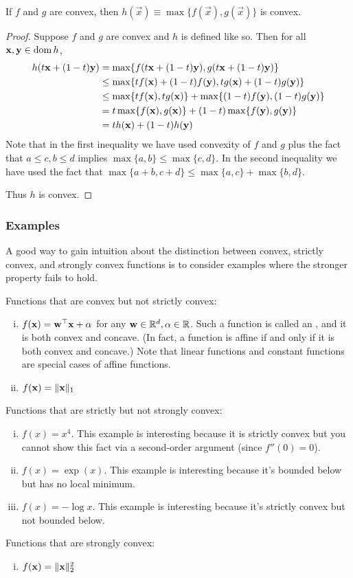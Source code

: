 \begin{proposition}
If $f$ and $g$ are convex, then $h(\vec{x}) \equiv \max\{f(\vec{x}), g(\vec{x})\}$ is convex.
\end{proposition}
\begin{proof}
Suppose $f$ and $g$ are convex and $h$ is defined like so. Then for all $\mathbf{x}, \mathbf{y} \in \operatorname*{dom} h$,
\begin{align*}
h(t\mathbf{x} + (1-t)\mathbf{y}) &= \max\{f(t\mathbf{x} + (1-t)\mathbf{y}), g(t\mathbf{x} + (1-t)\mathbf{y})\} \\
&\leq \max\{tf(\mathbf{x}) + (1-t)f(\mathbf{y}), tg(\mathbf{x}) + (1-t)g(\mathbf{y})\} \\
&\leq \max\{tf(\mathbf{x}), tg(\mathbf{x})\} + \max\{(1-t)f(\mathbf{y}), (1-t)g(\mathbf{y})\} \\
&= t\max\{f(\mathbf{x}), g(\mathbf{x})\} + (1-t)\max\{f(\mathbf{y}), g(\mathbf{y})\} \\
&= th(\mathbf{x}) + (1-t)h(\mathbf{y})
\end{align*}
Note that in the first inequality we have used convexity of $f$ and $g$ plus the fact that $a \leq c, b \leq d$ implies $\max\{a,b\} \leq \max\{c,d\}$.
In the second inequality we have used the fact that $\max\{a+b, c+d\} \leq \max\{a,c\} + \max\{b,d\}$.

Thus $h$ is convex.
\end{proof}

\subsubsection{Examples}
A good way to gain intuition about the distinction between convex, strictly convex, and strongly convex functions is to consider examples where the stronger property fails to hold.

Functions that are convex but not strictly convex:
\begin{enumerate}[(i)]
\item $f(\mathbf{x}) = \mathbf{w}^\top\mathbf{x} + \alpha$ for any $\mathbf{w} \in \mathbb{R}^d, \alpha \in \mathbb{R}$.
Such a function is called an , and it is both convex and concave.
(In fact, a function is affine if and only if it is both convex and concave.)
Note that linear functions and constant functions are special cases of affine functions.
\item $f(\mathbf{x}) = \|\mathbf{x}\|_1$
\end{enumerate}

Functions that are strictly but not strongly convex:
\begin{enumerate}[(i)]
\item $f(x) = x^4$.
This example is interesting because it is strictly convex but you cannot show this fact via a second-order argument (since $f''(0) = 0$).
\item $f(x) = \exp(x)$.
This example is interesting because it's bounded below but has no local minimum.
\item $f(x) = -\log x$.
This example is interesting because it's strictly convex but not bounded below.
\end{enumerate}

Functions that are strongly convex:
\begin{enumerate}[(i)]
\item $f(\mathbf{x}) = \|\mathbf{x}\|_2^2$
\end{enumerate}
